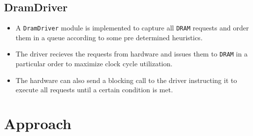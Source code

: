 \documentclass[hidelinks,12pt]{article}
\begin{document}
\subsection{DramDriver}
\begin{itemize}
    \item A \verb|DramDriver| module is implemented to capture all \verb|DRAM| requests and order them in a queue according to some pre determined heuristics.
    \item The driver recieves the requests from hardware and issues them to \verb|DRAM| in a particular order to maximize clock cycle utilization.
    \item The hardware can also send a blocking call to the driver instructing it to execute all requests until a certain condition is met.
\end{itemize}

\section{Approach}
\end{document}
